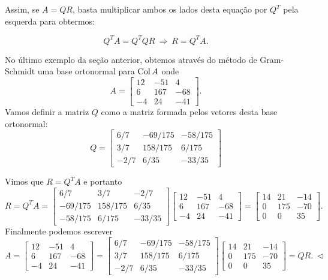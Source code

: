 \documentclass[../livro.tex]{subfiles}  %
\begin{document}
Assim, se $A=QR$, basta multiplicar ambos os lados desta equação por $Q^T$ pela esquerda para obtermos:

$$Q^T A = Q^T Q R \ \Longrightarrow \ R= Q^T A.$$






\vspace{0.3cm}



No último exemplo da seção anterior, obtemos através do método de Gram-Schmidt uma base ortonormal para $\operatorname{Col} A$
onde 
\[
A =
\begin{bmatrix}
12 & -51 & 4 \\
6 & 167 & -68 \\
-4 & 24 & -41
\end{bmatrix}.
\]
Vamos definir a matriz $Q$ como a matriz formada pelos vetores desta base ortonormal:
\[
Q =
\begin{bmatrix}
6/7 & -69/175 & -58/175 \\
3/7 & 158/175 & 6/175   \\
-2/7& 6/35   &-33/35
\end{bmatrix}
\] 

Vimos que $R=Q^T A$ e portanto
\[
R = Q^T A =
\begin{bmatrix}
6/7 & 3/7 & -2/7 \\
-69/175 & 158/175 & 6/35   \\
-58/175& 6/175   &-33/35
\end{bmatrix}
\begin{bmatrix}
12 & -51 & 4 \\
6 & 167 & -68 \\
-4 & 24 & -41
\end{bmatrix} =
\begin{bmatrix}
14&21&-14\\
0&175&-70\\
0&0&35
\end{bmatrix} .
\] 
Finalmente podemos escrever
\[
A =
\begin{bmatrix}
12 & -51 & 4 \\
6 & 167 & -68 \\
-4 & 24 & -41
\end{bmatrix} =
\begin{bmatrix}
6/7 & -69/175 & -58/175 \\
3/7 & 158/175 & 6/175   \\
-2/7& 6/35   &-33/35
\end{bmatrix}
\begin{bmatrix}
14&21&-14\\
0&175&-70\\
0&0&35
\end{bmatrix} = QR. \ \lhd
\]
\end{document}
